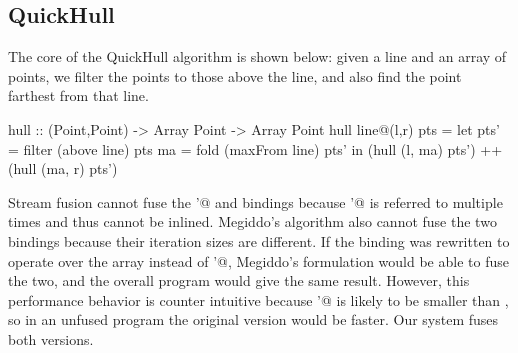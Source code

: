 \subsection{QuickHull}
The core of the QuickHull algorithm is shown below: given a line and an array of points, we filter the points to those above the line, and also find the point farthest from that line.

\begin{haskell}
hull :: (Point,Point) -> Array Point -> Array Point
hull line@(l,r) pts
 = let pts' = filter (above   line) pts
       ma   = fold   (maxFrom line) pts'
   in (hull (l, ma) pts') ++ (hull (ma, r) pts')
\end{haskell}

Stream fusion cannot fuse the \Hs@pts'@ and \Hs@ma@ bindings because \Hs@pts'@ is referred to multiple times and thus cannot be inlined. Megiddo's algorithm also cannot fuse the two bindings because their iteration sizes are different. If the \Hs@ma@ binding was rewritten to operate over the \Hs@pts@ array instead of \Hs@pts'@, Megiddo's formulation would be able to fuse the two, and the overall program would give the same result. However, this performance behavior is counter intuitive because \Hs@pts'@ is likely to be smaller than \Hs@pts@, so in an unfused program the original version would be faster. Our system fuses both versions.

